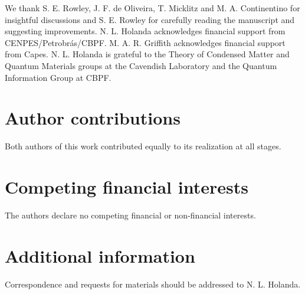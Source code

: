 \documentclass[10pt]{revtex4-1}
\begin{document}
We thank S. E. Rowley, J. F. de Oliveira, T. Micklitz and M. A. Continentino for insightful discussions and S. E. Rowley for carefully reading the manuscript and suggesting improvements. N. L. Holanda acknowledges financial support from CENPES/Petrobr\'as/CBPF. M. A. R. Griffith acknowledges financial support from Capes. N. L. Holanda is grateful to the Theory of Condensed Matter and Quantum Materials groups at the Cavendish Laboratory and the Quantum Information Group at CBPF.


\section*{Author contributions}

Both authors of this work contributed equally to its realization at all stages.

\section*{Competing financial interests}

The authors declare no competing financial or non-financial interests.

\section*{Additional information}

Correspondence and requests for materials should be addressed to N. L. Holanda. 
\end{document}
